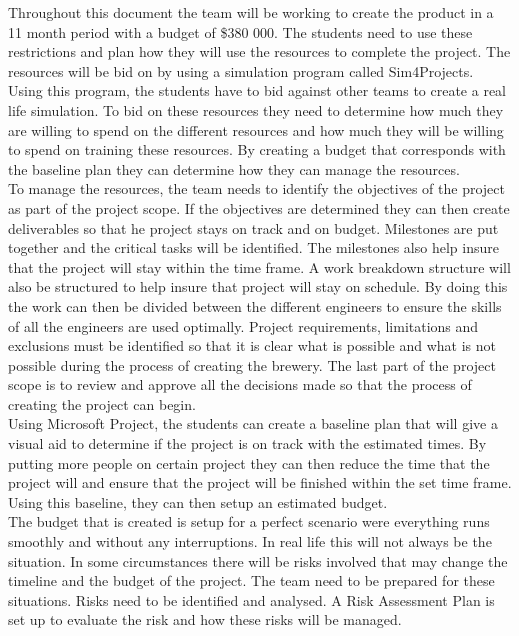 \noindent
Throughout this document the team will be working to create the product in a 11 month period with a budget of \$380 000. The students need to use these restrictions and plan how they will use the resources to complete the project. The resources will be bid on by using a simulation program called Sim4Projects. Using this program, the students have to bid against other teams to create a real life simulation. To bid on these resources they need to determine how much they are willing to spend on the different resources and how much they will be willing to spend on training these resources. By creating a budget that corresponds with the baseline plan they can determine how they can manage the resources.\\

\noindent
To manage the resources, the team needs to identify the objectives of the project as part of the project scope. If the objectives are determined they can then create deliverables so that he project stays on track and on budget. Milestones are put together and the critical tasks will be identified. The milestones also help insure that the project will stay within the time frame. A work breakdown structure will also be structured to help insure that project will stay on schedule. By doing this the work can then be divided between the different engineers to ensure the skills of all the engineers are used optimally. Project requirements, limitations and exclusions must be identified so that it is clear what is possible and what is not possible during the process of creating the brewery. The last part of the project scope is to review and approve all the decisions made so that the process of creating the project can begin.
\\

\noindent
Using Microsoft Project, the students can create a baseline plan that will give a visual aid to determine if the project is on track with the estimated times. By putting more people on certain project they can then reduce the time that the project will and ensure that the project will be finished within the set time frame. Using this baseline, they can then setup an estimated budget.\\

\noindent
The budget that is created is setup for a perfect scenario were everything runs smoothly and without any interruptions. In real life this will not always be the situation. In some circumstances there will be risks involved that may change the timeline and the budget of the project. The team need to be prepared for these situations. Risks need to be identified and analysed. A Risk Assessment Plan is set up to evaluate the risk and how these risks will be managed. 


